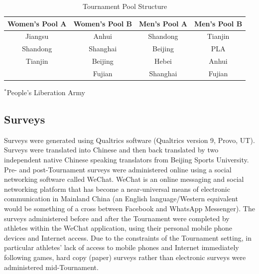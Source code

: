 \begin{landscape}
\begin{table}[htpb]\caption{Tournament Pool Structure}
  \begin{center}
    \begin{small}
        \begin{tabular}{| c | c || c | c |}
          \hline
          \bf Women's Pool A & \bf Women's Pool B &  \bf Men's Pool A & \bf  Men's Pool B \\
          \hline
          Jiangsu & Anhui & Shandong & Tianjin \\
          Shandong & Shanghai & Beijing & PLA\superscript{*} \\
          Tianjin & Beijing & Hebei & Anhui \\
             & Fujian & Shanghai & Fujian \\
             \hline
        \end{tabular}
          \end{small}
        \end{center}

        \begin{footnotesize}
          $^*$People's Liberation Army
        \end{footnotesize}
  \label{tab:poolStructure}
    \end{table}
  \end{landscape}
 \restoregeometry



\subsection{Surveys}
Surveys were generated using Qualtrics software (Qualtrics version 9, Provo, UT). Surveys were translated into Chinese and then back translated by two independent native Chinese speaking translators from Beijing Sports University.  Pre- and post-Tournament surveys were administered online using a social networking software called WeChat. WeChat is an online messaging and social networking platform that has become a near-universal means of electronic communication in Mainland China (an English language/Western equivalent would be something of a cross between Facebook and WhatsApp Messenger). The surveys administered before and after the Tournament were completed by athletes within the WeChat application, using their personal mobile phone devices and Internet access. Due to the constraints of the Tournament setting, in particular athletes’ lack of access to mobile phones and Internet immediately following games, hard copy (paper) surveys rather than electronic surveys were administered mid-Tournament.

